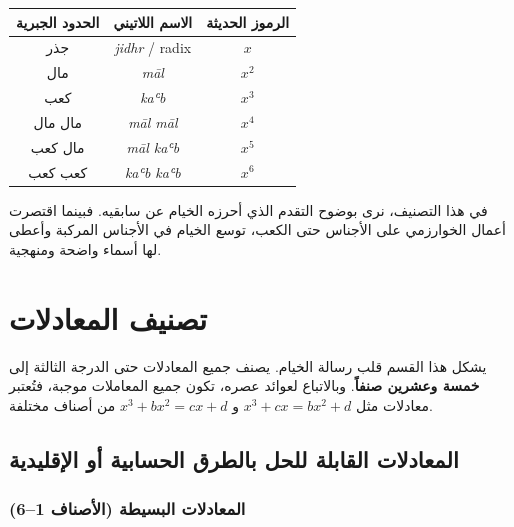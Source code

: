\documentclass[11pt,a4paper]{book}
\newcommand{\ar}[1]{\leavevmode\arabicfont\beginR #1\endR}
\newcommand{\arBold}[1]{\leavevmode\arabicfontbold\beginR #1\endR}
\begin{document}
\begin{center}
\renewcommand{\arraystretch}{1.4}
\begin{tabular}{ccc}
\toprule
\arBold{الحدود الجبرية} & \textbf{الاسم اللاتيني} & \textbf{الرموز الحديثة} \\
\midrule
\ar{جذر} & \textit{jidhr} / radix & $x$ \\
\ar{مال} & \textit{māl} & $x^2$ \\
\ar{كعب} & \textit{kaʿb} & $x^3$ \\
\ar{مال مال} & \textit{māl māl} & $x^4$ \\
\ar{مال كعب} & \textit{māl kaʿb} & $x^5$ \\
\ar{كعب كعب} & \textit{kaʿb kaʿb} & $x^6$ \\
\bottomrule
\end{tabular}
\end{center}

\vspace{0.3cm}

\ar{في هذا التصنيف، نرى بوضوح التقدم الذي أحرزه الخيام عن سابقيه. فبينما اقتصرت أعمال الخوارزمي على الأجناس حتى الكعب، توسع الخيام في الأجناس المركبة وأعطى لها أسماء واضحة ومنهجية.}

\clearpage

\section{\ar{تصنيف المعادلات}}

\ar{يشكل هذا القسم قلب رسالة الخيام. يصنف جميع المعادلات حتى الدرجة الثالثة إلى \textbf{خمسة وعشرين صنفاً}. وبالاتباع لعوائد عصره، تكون جميع المعاملات موجبة، فتُعتبر معادلات مثل $x^3 + cx = bx^2 + d$ و $x^3 + bx^2 = cx + d$ من أصناف مختلفة.}

\subsection{\ar{المعادلات القابلة للحل بالطرق الحسابية أو الإقليدية}}

\subsubsection{\ar{المعادلات البسيطة (الأصناف 1--6)}}
\end{document}
